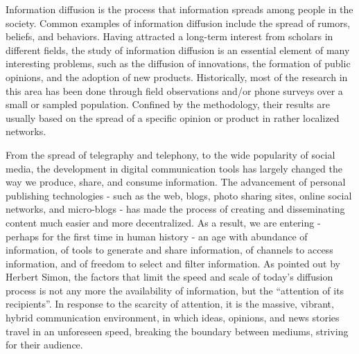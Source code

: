 \documentclass[phd,tocprelim]{cornell}
\begin{document}
Information diffusion is the process that information spreads among people in the society. Common examples of information diffusion include the spread of rumors, beliefs, and behaviors. 
Having attracted a long-term interest from scholars in different fields, the study of information diffusion is an essential element of many interesting problems, such
as the diffusion of innovations\cite{rogers-2003}, the formation of public opinions\cite{katz_lazarsfeld,Watts-2007}, and the adoption of new products\cite{Bass:1969}. Historically, most of the research in this area has been done through field observations and/or phone surveys\cite{katz_57,rogers-2003} over a small or sampled population. Confined by the methodology, their results are usually based on the spread of a specific opinion or product in rather localized networks. 

From the spread of telegraphy and telephony, to the wide popularity of social media, the development in digital communication tools has largely changed the way we produce, share, and consume information. The advancement of personal publishing technologies - such as the web, blogs, photo sharing sites, online social networks, and micro-blogs - has made the process of creating and disseminating content much easier and more decentralized. As a result, we are entering - perhaps for the first time in human history - an age with abundance of information, of tools to generate and share information, of channels to access information, and of freedom to select and filter information. As pointed out by Herbert Simon\cite{Simon-1971}, the factors that limit the speed and scale of today's diffusion process is not any more the availability of information, but the ``attention of its recipients''. In response to the scarcity of attention, it is the massive, vibrant, hybrid communication environment, in which ideas, opinions, and news stories travel in an unforeseen speed, breaking the boundary between mediums, striving for their audience\cite{Leskovec-Newscycle-2009}.

\end{document}
